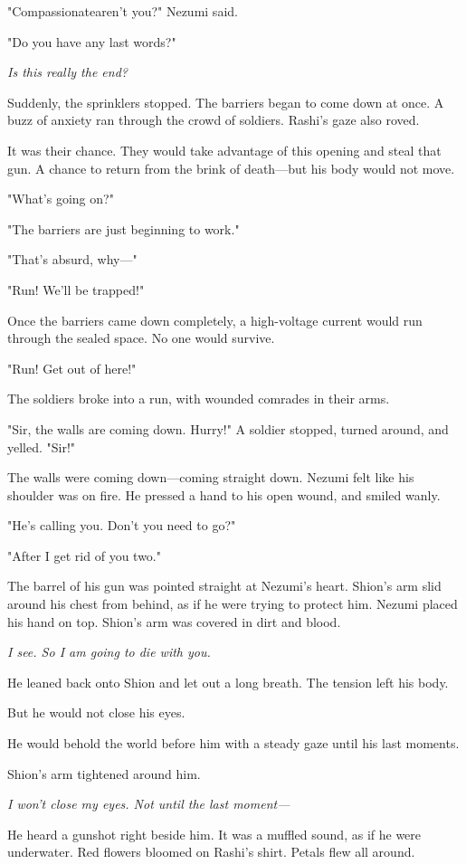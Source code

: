 "Compassionate\el aren't you?" Nezumi said.

"Do you have any last words?"

\emph{Is this really the end?}

Suddenly, the sprinklers stopped. The barriers began to come down at
once. A buzz of anxiety ran through the crowd of soldiers. Rashi's gaze
also roved.

It was their chance. They would take advantage of this opening and steal
that gun. A chance to return from the brink of death---but his body would
not move.

"What's going on?"

"The barriers are just beginning to work."

"That's absurd, why---"

"Run! We'll be trapped!"

Once the barriers came down completely, a high-voltage current would run
through the sealed space. No one would survive.

"Run! Get out of here!"

The soldiers broke into a run, with wounded comrades in their arms.

"Sir, the walls are coming down. Hurry!" A soldier stopped, turned
around, and yelled. "Sir!"

The walls were coming down---coming straight down. Nezumi felt like his
shoulder was on fire. He pressed a hand to his open wound, and smiled
wanly.

"He's calling you. Don't you need to go?"

"After I get rid of you two."

The barrel of his gun was pointed straight at Nezumi's heart. Shion's
arm slid around his chest from behind, as if he were trying to protect
him. Nezumi placed his hand on top. Shion's arm was covered in dirt and
blood.

\emph{I see. So I am going to die with you.}

He leaned back onto Shion and let out a long breath. The tension left
his body.

But he would not close his eyes.

He would behold the world before him with a steady gaze until his last
moments.

Shion's arm tightened around him.

\emph{I won't close my eyes. Not until the last moment---}

He heard a gunshot right beside him. It was a muffled sound, as if he
were underwater. Red flowers bloomed on Rashi's shirt. Petals flew all
around.


